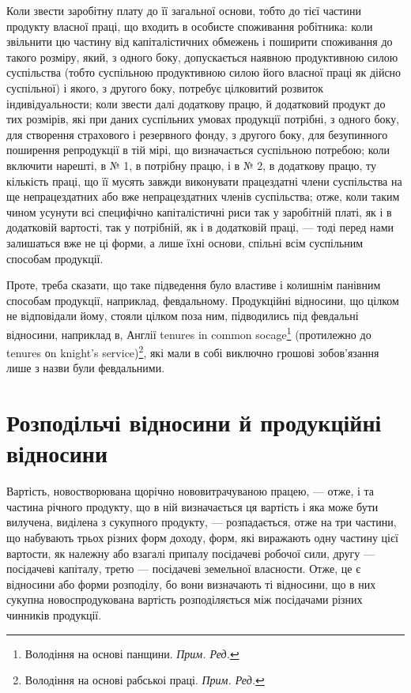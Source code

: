 Коли звести заробітну плату до її загальної основи, тобто до тієї частини
продукту власної праці, що входить в особисте споживання робітника: коли
звільнити цю частину від капіталістичних обмежень і поширити споживання до
такого розміру, який, з одного боку, допускається наявною продуктивною силою
суспільства (тобто суспільною продуктивною силою його власної праці як дійсно
суспільної) і якого, з другого боку, потребує цілковитий розвиток індивідуальности; коли звести далі
додаткову працю, й додатковий продукт до тих розмірів,
які при даних суспільних умовах продукції потрібні, з одного боку, для створення
страхового і резервного фонду, з другого боку, для безупинного поширення
репродукції в тій мірі, що визначається суспільною потребою; коли включити
нарешті, в № 1, в потрібну працю, і в № 2, в додаткову працю, ту кількість
праці, що її мусять завжди виконувати працездатні члени суспільства на ще
непрацездатних або вже непрацездатних членів суспільства; отже, коли таким
чином усунути всі специфічно капіталістичні риси так у заробітній платі, як і в
додатковій вартості, так у потрібній, як і в додатковій праці, — тоді перед
нами залишаться вже не ці форми, а лише їхні основи, спільні всім суспільним
способам продукції.

Проте, треба сказати, що таке підведення було властиве і колишнім панівним
способам продукції, наприклад, февдальному. Продукційні відносини, що
цілком не відповідали йому, стояли цілком поза ним, підводились під февдальні
відносини, наприклад в, Англії tenures in common socage\footnote*{
Володіння на основі панщини. \emph{Прим. Ред.}
} (протилежно до tenures
оn knight’s service)\footnote*{
Володіння на основі рабськоі праці. \emph{Прим. Ред.}
}, які мали в собі виключно грошові зобов’язання
лише з назви були февдальними.

\section{Розподільчі відносини й продукційні відносини}

Вартість, новостворювана щорічно нововитрачуваною працею, — отже, і та
частина річного продукту, що в ній визначається ця вартість і яка може бути
вилучена, виділена з сукупного продукту, — розпадається, отже на три частини,
що набувають трьох різних форм доходу, форм, які виражають одну частину
цієї вартости, як належну або взагалі припалу посідачеві робочої
сили, другу — посідачеві капіталу, третю — посідачеві земельної власности.
Отже, це є відносини або форми розподілу, бо вони визначають ті відносини,
що в них сукупна новоспродукована вартість розподіляється між посідачами
різних чинників продукції.

